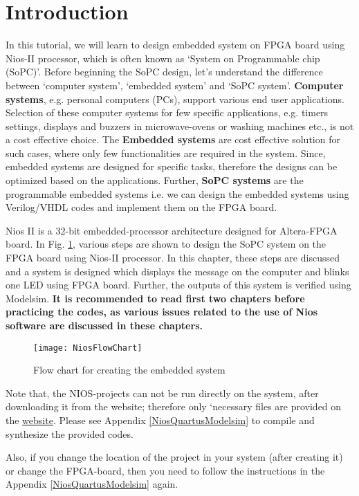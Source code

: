 \section{Introduction}
In this tutorial, we will learn to design embedded system on FPGA board using Nios-II processor, which is often known as `System on Programmable chip (SoPC)'. Before beginning the SoPC design, let's understand the difference between `computer system', `embedded system' and `SoPC system'. \textbf{Computer systems}, e.g. personal computers (PCs), support various end user applications. Selection of these computer systems for few specific applications, e.g. timers settings, displays and buzzers in microwave-ovens or washing machines etc.,  is not a cost effective choice. The \textbf{Embedded systems} are cost effective solution for such cases, where only few functionalities are required in the system.  Since, embedded systems are designed for specific tasks, therefore the designs can be optimized based on the applications. Further, \textbf{SoPC systems} are the programmable embedded systems i.e. we can design the embedded systems using Verilog/VHDL codes and implement them on the FPGA board.

Nios II is a 32-bit embedded-processor architecture designed for Altera-FPGA board. In Fig. \ref{fig:NiosFlowChart}, various steps are shown to design the SoPC system on the FPGA board using Nios-II processor. In this chapter, these steps are discussed and a system is designed which displays the message on the computer and blinks one LED using FPGA board. Further, the outputs of this system is verified using Modelsim.  \textbf{It is recommended to read first two chapters before practicing the codes, as various issues related to the use of Nios software are discussed in these chapters.}
\begin{figure}[!h]
	\centering
	\texttt{[image: NiosFlowChart]}
	\caption{Flow chart for creating the embedded system}
	\label{fig:NiosFlowChart}
\end{figure}

\begin{noNumBox}
Note that, the NIOS-projects can not be run directly on the system, after downloading it from the website; therefore only `necessary files are provided on the \href{http://pythondsp.readthedocs.io/en/latest/pythondsp/toc.html}{website}. Please see Appendix \ref{NiosQuartusModelsim} to compile and synthesize the provided codes.
\end{noNumBox}

\begin{noNumBox}
Also, if you change the location of the project in your system (after creating it) or change the FPGA-board, then you need to follow the instructions in the Appendix \ref{NiosQuartusModelsim} again.  
\end{noNumBox}


